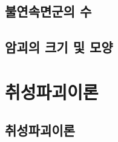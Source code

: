 \documentclass[12pt, a4paper, oneside]{book}
\begin{document}
	\section{불연속면군의 수}
	
	
	
	\clearpage
	\section{암괴의 크기 및 모양}
	
	
	
	
	
	
	
	
	
	
	
	
	
	
	\clearpage
	\chapter{취성파괴이론}



	
	\clearpage
	\section{취성파괴이론}
	

	
	
	
	
	



	

\end{document}
